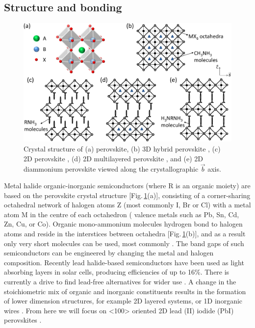 \subsection{Structure and bonding}
\begin{figure}[h!] 
\centering    
\includegraphics[width=\textwidth]{Fig3}
\caption[Crystal structure of (a)  perovskite, (b) 3D hybrid perovskite, (c) 2D hybrid perovskite, (d) 2D multilayered perovskite, and (e) 2D diammonium perovskite viewed along the crystallographic $\vec{b}$ axis.]{Crystal structure of (a)  perovskite, (b) 3D hybrid perovskite , (c) 2D perovskite , (d) 2D multilayered perovskite , and (e) 2D diammonium perovskite  viewed along the crystallographic $\vec{b}$ axis.}
\label{2Fig3}
\end{figure}
Metal halide  organic-inorganic semiconductors (where R is an organic moiety) are based on the  perovskite crystal structure [Fig.\,\ref{2Fig3}(a)], consisting of a corner-sharing octahedral network of halogen atoms Z (most commonly I, Br or Cl) with a metal atom M in the centre of each octahedron ( valence metals such as Pb, Sn, Cd, Zn, Cu, or Co). Organic mono-ammonium molecules  hydrogen bond to halogen atoms and reside in the interstices between octahedra [Fig.\,\ref{2Fig3}(b)], and as a result only very short molecules can be used, most commonly . The band gaps of such semiconductors can be engineered by changing the metal and halogen composition. Recently lead halide-based semiconductors have been used as light absorbing layers in solar cells, producing efficiencies of up to 16\%. There is currently a drive to find lead-free alternatives for wider use \cite{Lee2012, Heo2013, Liu2013, Hao2014}. A change in the stoichiometric mix of organic and inorganic constituents results in the formation of lower dimension structures, for example 2D layered systems, or 1D inorganic wires \cite{Nagami1996, Fukumoto2000, Fujisawa2004, Pradeesh2010}. From here we will focus on <100> oriented 2D lead (II) iodide (PbI) perovskites \cite{Mitzi2001}.

